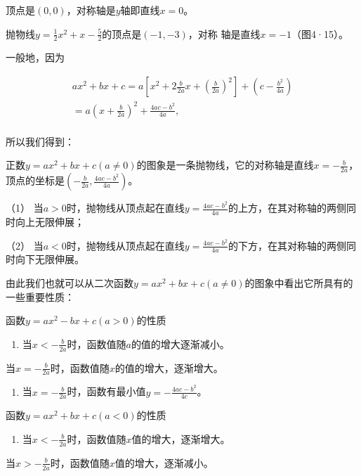 顶点是\((0,0)\)，对称轴是\(y\)轴即直线\(x = 0\)。

抛物线\(y = \frac{1}{2} x^2 + x - \frac{5}{2}\)的顶点是\((-1, -3)\)，对称
轴是直线\(x = -1\)（图4·15）。

一般地，因为

\[
\begin{array}{l} a x^{2} + b x + c = a \left[ x^{2} + 2 \frac{b}{2 a} x + \left(\frac{b}{2 a}\right)^{2} \right] + \left(c - \frac{b^{2}}{4 a}\right) \\ = a \left(x + \frac{b}{2 a}\right)^{2} + \frac{4 a c - b^{2}}{4 a}, \\ \end{array}
\]

所以我们得到：

正数\(y = ax^2 + bx + c (a \neq 0)\)的图象是一条抛物线，它的对称轴是直线\(x = -\frac{b}{2a}\)，顶点的坐标是\(\left(-\frac{b}{2a}, \frac{4ac - b^2}{4a}\right)\)。

（1）
当\(a > 0\)时，抛物线从顶点起在直线\(y = \frac{4ac - b^2}{4a}\)的上方，在其对称轴的两侧同时向上无限伸展；

（2）
当\(a < 0\)时，抛物线从顶点起在直线\(y = \frac{4ac - b^2}{4a}\)的下方，在其对称轴的两侧同时向下无限伸展。

由此我们也就可以从二次函数\(y = ax^2 + bx + c (a \neq 0)\)的图象中看出它所具有的一些重要性质：

函数\(y = ax^2 - bx + c (a > 0)\)的性质

\begin{enumerate}
\item
  当\(x < -\frac{b}{2a}\)时，函数值随\(a\)的值的增大逐渐减小。
\end{enumerate}

当\(x = -\frac{b}{2a}\)时，函数值随\(x\)的值的增大，逐渐增大。

\begin{enumerate}[start=2]
\item
  当\(x = -\frac{b}{2a}\)时，函数有最小值\(y = -\frac{4ac - b^2}{4c}\)。
\end{enumerate}

函数\(y = ax^2 + bx + c (a < 0)\)的性质

\begin{enumerate}
\item
  当\(x < -\frac{b}{2a}\)时，函数值随\(x\)值的增大，逐渐增大。
\end{enumerate}

当\(x > -\frac{b}{2a}\)时，函数值随\(x\)值的增大，逐渐减小。


